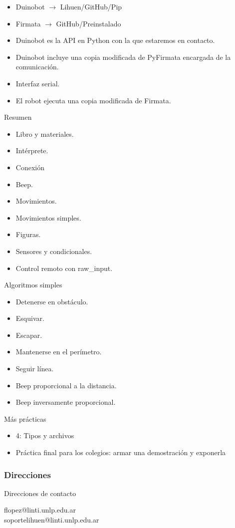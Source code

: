 \documentclass{beamer}[10]
\begin{document}
\begin{frame}
	\begin{itemize}
		\item Duinobot $\rightarrow$ Lihuen/GitHub/Pip
		\item Firmata $\rightarrow$ GitHub/Preinstalado
	\end{itemize}
	\begin{itemize}[<+->]
		\item Duinobot es la API en Python con la que estaremos en contacto.
		\item Duinobot incluye una copia modificada de PyFirmata encargada de la comunicación.
		\item Interfaz serial.
		\item El robot ejecuta una copia modificada de Firmata.
	\end{itemize}
\end{frame}
\begin{frame}{Resumen}
	\begin{itemize}[<+->]
		\item Libro y materiales.
		\item Intérprete.
		\item Conexión
		\item Beep.
		\item Movimientos.
		\item Movimientos simples.
		\item Figuras.
		\item Sensores y condicionales.
		\item Control remoto con raw\_input.
	\end{itemize}
\end{frame}
\begin{frame}{Algoritmos simples}
	\begin{itemize}[<+->]
		\item Detenerse en obstáculo.
		\item Esquivar.
		\item Escapar.
		\item Mantenerse en el perímetro.
		\item Seguir línea.
		\item Beep proporcional a la distancia.
		\item Beep inversamente proporcional.
	\end{itemize}
\end{frame}
\begin{frame}{Más prácticas}
	\begin{itemize}
		\item 4: Tipos y archivos
		\item Práctica final para los colegios: armar una demostración y exponerla
	\end{itemize}
\end{frame}
\frame
{
\frametitle{Direcciones}

\begin{block}{Direcciones de contacto}
\begin{center}
flopez@linti.unlp.edu.ar \\
soportelihuen@linti.unlp.edu.ar
\end{center}
\end{block}

}
\end{document}
